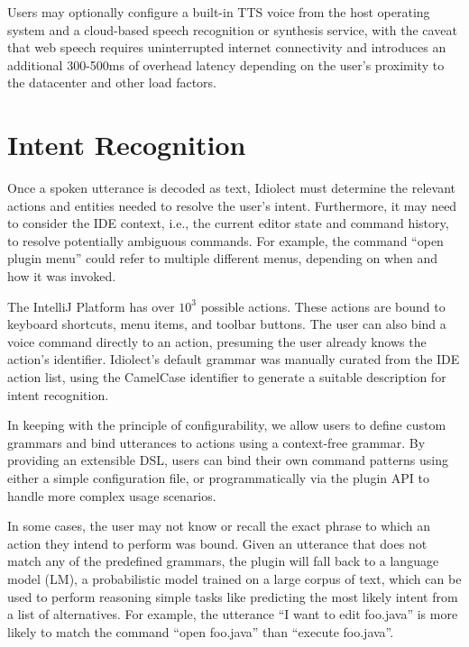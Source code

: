\documentclass[conference]{IEEEtran}
\begin{document}

Users may optionally configure a built-in TTS voice from the host operating system and a cloud-based speech recognition or synthesis service, with the caveat that web speech requires uninterrupted internet connectivity and introduces an additional 300-500ms of overhead latency depending on the user's proximity to the datacenter and other load factors.

\section{Intent Recognition}

Once a spoken utterance is decoded as text, Idiolect must determine the relevant actions and entities needed to resolve the user's intent. Furthermore, it may need to consider the IDE context, i.e., the current editor state and command history, to resolve potentially ambiguous commands. For example, the command ``open plugin menu'' could refer to multiple different menus, depending on when and how it was invoked.

The IntelliJ Platform has over $10^3$ possible actions. These actions are bound to keyboard shortcuts, menu items, and toolbar buttons. The user can also bind a voice command directly to an action, presuming the user already knows the action's identifier. Idiolect's default grammar was manually curated from the IDE action list, using the CamelCase identifier to generate a suitable description for intent recognition.

In keeping with the principle of configurability, we allow users to define custom grammars and bind utterances to actions using a context-free grammar. By providing an extensible DSL, users can bind their own command patterns using either a simple configuration file, or programmatically via the plugin API to handle more complex usage scenarios.

In some cases, the user may not know or recall the exact phrase to which an action they intend to perform was bound. Given an utterance that does not match any of the predefined grammars, the plugin will fall back to a language model (LM), a probabilistic model trained on a large corpus of text, which can be used to perform reasoning simple tasks like predicting the most likely intent from a list of alternatives. For example, the utterance ``I want to edit foo.java'' is more likely to match the command ``open foo.java'' than ``execute foo.java''.
\end{document}
